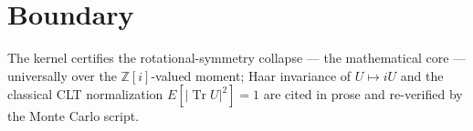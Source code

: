 \documentclass[11pt]{article}
\begin{document}
\section{Boundary}

The kernel certifies the rotational-symmetry collapse --- the
mathematical core --- universally over the $\mathbb{Z}[i]$-valued
moment; Haar invariance of $U \mapsto iU$ and the classical CLT
normalization $E[|\operatorname{Tr} U|^2] = 1$ are cited in prose and
re-verified by the Monte Carlo script.
\end{document}
